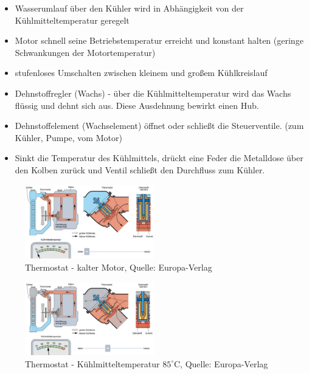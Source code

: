 \begin{itemize}
\item
  Wasserumlauf über den Kühler wird in Abhängigkeit von der
  Kühlmitteltemperatur geregelt
\item
  Motor schnell seine Betriebstemperatur erreicht und konstant halten
  (geringe Schwankungen der Motortemperatur)
\item
  stufenloses Umschalten zwischen kleinem und großem Kühlkreislauf
\item
  Dehnstoffregler (Wachs) - über die Kühlmitteltemperatur wird das Wachs
  flüssig und dehnt sich aus. Diese Ausdehnung bewirkt einen Hub.
\item
  Dehnstoffelement (Wachselement) öffnet oder schließt die
  Steuerventile. (zum Kühler, Pumpe, vom Motor)
\item
  Sinkt die Temperatur des Kühlmittels, drückt eine Feder die Metalldose
  über den Kolben zurück und Ventil schließt den Durchfluss zum Kühler.
\end{itemize}

\begin{figure}[!ht]%
\centering
\includegraphics[width=0.5\textwidth]{images/Kuehlsystem/Kuehlsystem-5.pdf}
\caption{Thermostat - kalter Motor, Quelle: Europa-Verlag}
\end{figure}

\begin{figure}[!ht]%
\centering
\includegraphics[width=0.5\textwidth]{images/Kuehlsystem/Kuehlsystem-6.pdf}
\caption{Thermostat - Kühlmitteltemperatur $85^\circ\text{C}$, Quelle:
Europa-Verlag}
\end{figure}

